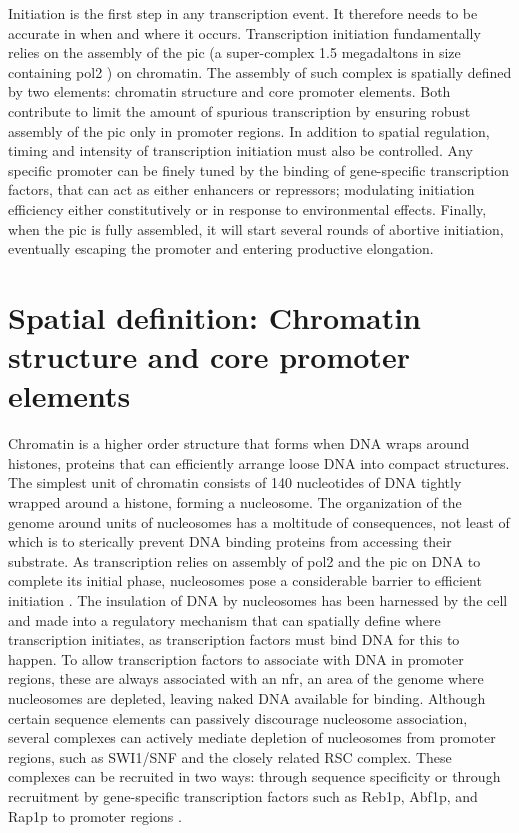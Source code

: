 Initiation is the first step in any transcription event. 
It therefore needs to be accurate in when and where it occurs. 
Transcription initiation fundamentally relies on the assembly of the \gls{pic} (a super-complex 1.5 megadaltons in size  containing \gls{pol2} \cite{fazal:2015:realtime}) on chromatin.
The assembly of such complex is spatially defined by two elements: chromatin structure and core promoter elements.
Both contribute to limit the amount of spurious transcription by ensuring robust assembly of the \gls{pic} only in promoter regions.
In addition to spatial regulation, timing and intensity of transcription initiation must also be controlled.
Any specific promoter can be finely tuned by the binding of gene-specific transcription factors, that can act as either enhancers or repressors; modulating initiation efficiency either constitutively or in response to environmental effects. 
Finally, when the \gls{pic} is fully assembled, it will start several rounds of abortive initiation, eventually escaping the promoter and entering productive elongation.

\section{Spatial definition: Chromatin structure and core promoter elements}

Chromatin is a higher order structure that forms when DNA wraps around histones, proteins that can efficiently arrange loose DNA into compact structures.
The simplest unit of chromatin consists of 140 nucleotides of DNA tightly wrapped around a histone, forming a nucleosome.
The organization of the genome around units of nucleosomes has a moltitude of consequences, not least of which is to sterically prevent DNA binding proteins from accessing their substrate. 
As transcription relies on assembly of \gls{pol2} and the \gls{pic} on DNA to complete its initial phase, nucleosomes pose a considerable barrier to efficient initiation \cite{field:2008:distinct} \cite{jiang:2009:compiled}.
The insulation of DNA by nucleosomes has been harnessed by the cell and made into a regulatory mechanism that can spatially define where transcription initiates, as transcription factors must bind DNA for this to happen. 
To allow transcription factors to associate with DNA in promoter regions, these are always associated with an \gls{nfr}, an area of the genome where nucleosomes are depleted, leaving naked DNA available for binding.
Although certain sequence elements can passively discourage nucleosome association, several complexes can actively mediate depletion of nucleosomes from promoter regions, such as SWI1/SNF and the closely related RSC complex.
These complexes can be recruited in two ways: through sequence specificity \cite{badis:2008:library, knight:2014:two} or through recruitment by gene-specific transcription factors such as Reb1p, Abf1p, and Rap1p to promoter regions \citep{floer:2010:rscnucleosome, hartley:2009:mechanisms, spain:2014:rsc, badis:2008:library}.

